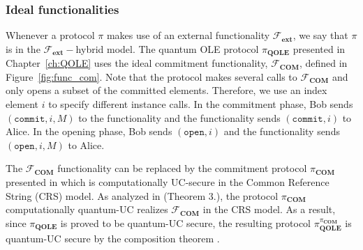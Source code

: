  


\subsubsection{Ideal functionalities}\label{functinalities}

Whenever a protocol $\pi$ makes use of an external functionality $\mathcal{F}_{\textbf{ext}}$, we say that $\pi$ is in the $\mathcal{F}_{\textbf{ext}}-$hybrid model. The quantum OLE protocol $\mathcal{\pi}_{\textbf{QOLE}}$ presented in Chapter~\ref{ch:QOLE} uses the ideal commitment functionality, $\mathcal{F}_{\textbf{COM}}$, defined in Figure~\ref{fig:func_com}. Note that the protocol makes several calls to $\mathcal{F}_{\textbf{COM}}$ and only opens a subset of the committed elements. Therefore, we use an index element $i$ to specify different instance calls. In the commitment phase, Bob sends $(\texttt{commit}, i, M)$ to the functionality and the functionality sends $(\texttt{commit}, i)$ to Alice. In the opening phase, Bob sends $(\texttt{open}, i)$ and the functionality sends $(\texttt{open}, i, M)$ to Alice.

The $\mathcal{F}_{\textbf{COM}}$ functionality can be replaced by the commitment protocol $\pi_{\textbf{COM}}$ presented in \cite{C01} which is computationally UC-secure in the Common Reference String (CRS) model. As analyzed in \cite{CBGLM21} (Theorem 3.), the protocol $\pi_{\textbf{COM}}$ computationally quantum-UC realizes $\mathcal{F}_{\textbf{COM}}$ in the CRS model. As a result, since $\mathcal{\pi}_{\textbf{QOLE}}$ is proved to be quantum-UC secure, the resulting protocol $\pi_{\textbf{QOLE}}^{\pi_{\textbf{COM}}}$ is quantum-UC secure by the composition theorem \citep{Unruh10}.


%    
%    


